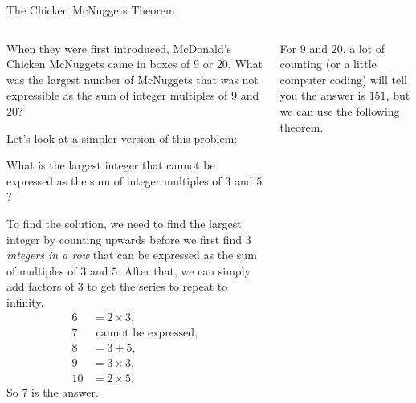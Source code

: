 \documentclass[9pt,aspectratio=169]{beamer}
\begin{document}
\begin{frame}{The Chicken McNuggets Theorem}
  \begin{columns}[T]
    \begin{column}{0.5\textwidth}
      \begin{problem}
        When they were first introduced, McDonald's Chicken McNuggets came in boxes of $9$ or $20$.  What was the largest number of McNuggets that was not expressible as the sum of integer multiples of $9$ and $20$?
      \end{problem}
      {\small
      Let's look at a simpler version of this problem: 
      \begin{problem}
        What is the largest integer that cannot be expressed as the sum of integer multiples of $3$ and $5$?
      \end{problem}

      To find the solution, we need to find the largest integer by counting upwards before we first find \emph{$3$ integers in a row} that can be expressed as the sum of multiples of $3$ and $5$.  After that, we can simply add factors of $3$ to get the series to repeat to infinity.
      \begin{align*}
        6 &= 2 \times 3, \\
        7 &\text{ cannot be expressed}, \\ 
        8 &= 3 + 5, \\
        9 &= 3 \times 3, \\
        10 &= 2 \times 5. 
      \end{align*} 
      So $7$ is the answer.
      }
    \end{column}
    \begin{column}{0.5\textwidth}
      For $9$ and $20$, a lot of counting (or a little computer coding) will tell you the answer is $151$, but we can use the following theorem.
      

\end{column}
\end{columns}
\end{frame}
\end{document}
